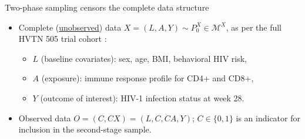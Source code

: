 \documentclass{beamer}
\begin{document}

\begin{frame}[c]{Two-phase sampling censors the complete data structure}

\begin{center}
\begin{itemize}
  \itemsep10pt
  \item Complete (\underline{unobserved}) data $X = (L, A, Y) \sim P_0^X \in
    \mathcal{M}^X$, as per the full HVTN 505 trial cohort
    \citep{hammer2013efficacy}:
    \vspace{1em}
    \begin{itemize}
      \itemsep8pt
      \item $L$ (baseline covariates): sex, age, BMI, behavioral HIV risk,
      \item $A$ (exposure): immune response profile for CD4+ and CD8+,
      \item $Y$ (outcome of interest): HIV-1 infection status at week 28.
    \end{itemize}
  \item Observed data $O = (C, C X) = (L, C, C A, Y)$; $C \in \{0,1\}$ is an
    indicator for inclusion in the second-stage sample.
\end{itemize}
\end{center}


\end{frame}

\end{document}
